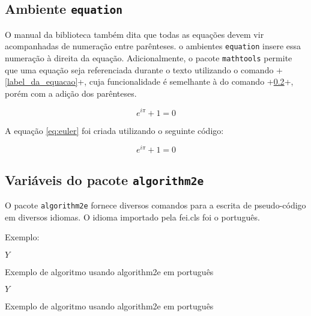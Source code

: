 \documentclass[xindy,draft]{fei}
\begin{document}
	\subsection{Ambiente \texttt{equation}}
	
	O manual da biblioteca também dita que todas as equações devem vir acompanhadas de numeração entre parênteses. o ambientes \texttt{equation} insere essa numeração à direita da equação. Adicionalmente, o pacote \texttt{mathtools} permite que uma equação seja referenciada durante o texto utilizando o comando \latexinline+\eqref{label_da_equacao}+, cuja funcionalidade é semelhante à do comando \latexinline+\ref{}+, porém com a adição dos parênteses.
	
	\begin{equation} \label{eq:euler}
	e^{i\pi}+1=0
	\end{equation}
	
	A equação \eqref{eq:euler} foi criada utilizando o seguinte código:
	
	\begin{latexcode}
	\begin{equation} \label{eq:euler}
	e^{i\pi}+1=0
	\end{equation}	
	\end{latexcode}
    
    \subsection{Variáveis do pacote \texttt{algorithm2e}}
    
    O pacote \texttt{algorithm2e} fornece diversos comandos para a escrita de pseudo-código em diversos idiomas. O idioma importado pela fei.cls foi o português.
    
    Exemplo:

\begin{latexcode}
\begin{algorithm}
	\Retorna \(Y\)
	\caption{Exemplo de algoritmo usando algorithm2e em português}
	\label{lst:alg}
\end{algorithm}
\end{latexcode}
    
\begin{algorithm}


\Retorna \(Y\)

\caption{Exemplo de algoritmo usando algorithm2e em português}
\label{lst:alg}
\end{algorithm}
\end{document}
